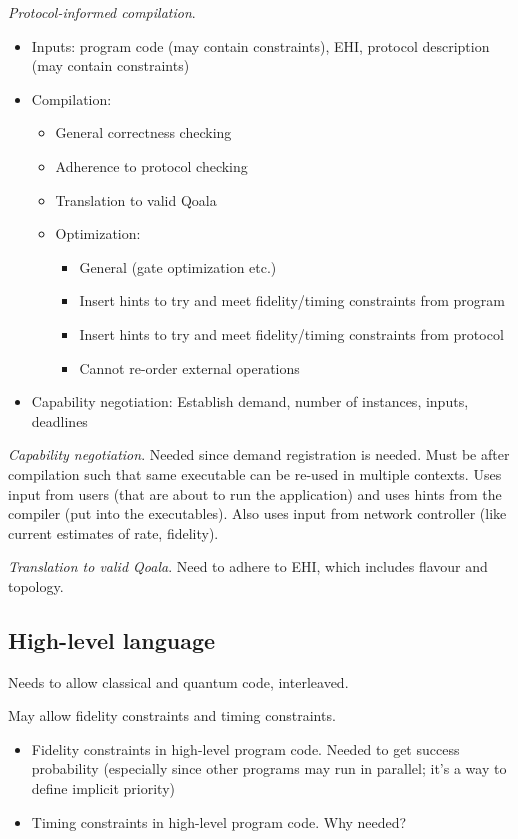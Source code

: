 \textit{Protocol-informed compilation}.
\begin{itemize}
    \item Inputs: program code (may contain constraints), EHI, protocol description (may contain constraints)
    \item Compilation:
    \begin{itemize}
        \item General correctness checking
        \item Adherence to protocol checking
        \item Translation to valid Qoala
        \item Optimization:
        \begin{itemize}
            \item General (gate optimization etc.)
            \item Insert hints to try and meet fidelity/timing constraints from program
            \item Insert hints to try and meet fidelity/timing constraints from protocol
            \item Cannot re-order external operations
        \end{itemize}
    \end{itemize}
    \item Capability negotiation: Establish demand, number of instances, inputs, deadlines
\end{itemize}

\textit{Capability negotiation}. Needed since demand registration is needed. Must be after compilation such that same executable can be re-used in multiple contexts. Uses input from users (that are about to run the application) and uses hints from the compiler (put into the executables). Also uses input from network controller (like current estimates of rate, fidelity).


\textit{Translation to valid Qoala}. Need to adhere to EHI, which includes flavour and topology.



\subsection{High-level language}
Needs to allow classical and quantum code, interleaved.

May allow fidelity constraints and timing constraints.

\begin{itemize}
    \item Fidelity constraints in high-level program code. Needed to get success probability (especially since other programs may run in parallel; it's a way to define implicit priority)
    \item Timing constraints in high-level program code. Why needed?
\end{itemize}


